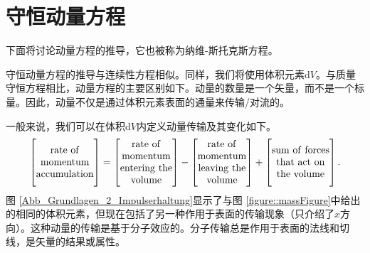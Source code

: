 \documentclass[MathematicsNumericsDerivationsAndOpenFOAM.tex]{subfiles}
\begin{document}


\section{守恒动量方程}
\label{SECTION::momentum}
%
%
下面将讨论动量方程的推导，它也被称为纳维-斯托克斯方程。
	
守恒动量方程的推导与连续性方程相似。同样，我们将使用体积元素d$V$。与质量守恒方程相比，动量方程的主要区别如下。动量的数量是一个矢量，而不是一个标量。因此，动量不仅是通过体积元素表面的通量来传输/对流的。

%
%
	一般来说，我们可以在体积d$V$内定义动量传输及其变化如下。
%
%
\begin{equation}
\left[
 \vphantom{\begin{matrix} . \\ . \\ . \\ . \end{matrix}}
 \begin{matrix}
  \rmm{rate~of}\\
  \rmm{momentum}\\
  \rmm{accumulation}
 \end{matrix}
\right]
=
\left[
 \begin{matrix}
  \rmm{rate~of}\\
  \rmm{momentum}\\
  \rmm{entering~the}\\
  \rmm{volume}
 \end{matrix}
\right]
-
\left[
 \begin{matrix}
  \rmm{rate~of}\\
  \rmm{momentum}\\
  \rmm{leaving~the}\\
  \rmm{volume}
 \end{matrix}
\right]
+
\left[
 \vphantom{\begin{matrix} . \\ . \\ . \\ . \end{matrix}}
 \begin{matrix}
  \rmm{sum~of~forces}\\
  \rmm{that~act~on}\\
  \rmm{the~volume}
 \end{matrix}
\right] .
\label{EQUATION::momentum}
\end{equation}
%
%
	图 \ref{Abb_Grundlagen_2_Impulserhaltung}显示了与图 \ref{figure::massFigure}中给出的相同的体积元素，但现在包括了另一种作用于表面的传输现象（只介绍了$x$方向）。这种动量的传输是基于分子效应的。分子传输总是作用于表面的法线和切线，是矢量的结果或属性。
\end{document}
